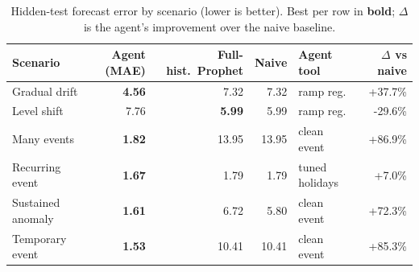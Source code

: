 \begin{table}[t]
  \centering
  \caption{Hidden-test forecast error by scenario (lower is better). Best per row in \textbf{bold}; $\Delta$ is the agent's improvement over the naive baseline.}
  \label{tab:results}
  \small
  \begin{tabular}{l r r r l r}
    \toprule
    Scenario & Agent (MAE) & Full-hist.\ Prophet & Naive & Agent tool & $\Delta$ vs naive \\
    \midrule
    Gradual drift & \textbf{4.56} & 7.32 & 7.32 & ramp reg. & +37.7\% \\
    Level shift & 7.76 & \textbf{5.99} & 5.99 & ramp reg. & -29.6\% \\
    Many events & \textbf{1.82} & 13.95 & 13.95 & clean event & +86.9\% \\
    Recurring event & \textbf{1.67} & 1.79 & 1.79 & tuned holidays & +7.0\% \\
    Sustained anomaly & \textbf{1.61} & 6.72 & 5.80 & clean event & +72.3\% \\
    Temporary event & \textbf{1.53} & 10.41 & 10.41 & clean event & +85.3\% \\
    \bottomrule
  \end{tabular}
\end{table}
